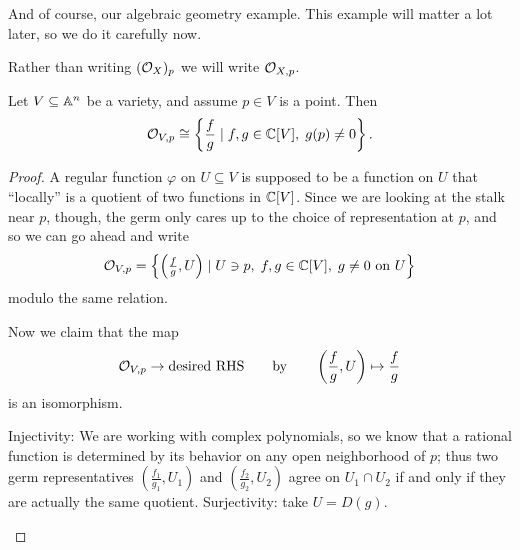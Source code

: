 And of course, our algebraic geometry example.
This example will matter a lot later,
so we do it carefully now.
\begin{abuse}
	Rather than writing $(\mathcal O_X)_p$ we will write $\mathcal O_{X,p}$.
\end{abuse}
\begin{theorem}
	[Stalks of $\OO_V$]
	\label{thm:stalks_affine_var}
	Let $V \subseteq \mathbb A^n$ be a variety,
	and assume $p \in V$ is a point.
	Then \[ \mathcal O_{V,p} \cong
		\left\{ \frac fg \mid f,g \in \mathbb C[V], \; g(p) \neq 0 \right\}. \]
\end{theorem}
\begin{proof}
	A regular function $\varphi$ on $U \subseteq V$
	is supposed to be a function on $U$ that ``locally'' is a quotient
	of two functions in $\mathbb C[V]$.
	Since we are looking at the stalk near $p$, though,
	the germ only cares up to the choice of representation at $p$,
	and so we can go ahead and write
	\[
		\mathcal O_{V,p} =
		\left\{ \left( \tfrac fg , U \right) \mid
			U \ni p, \; f,g \in \mathbb C[V], \;
			\text{$g \neq 0$ on $U$} \right\}
	\]
	modulo the same relation.

	Now we claim that the map
	\[ \mathcal O_{V,p} \to \text{desired RHS}
		\qquad\text{by}\qquad \left( \frac fg, U \right) \mapsto \frac fg \]
	is an isomorphism.
	\begin{itemize}
		\ii Injectivity: We are working with complex polynomials,
		so we know that a rational function is determined by its
		behavior on any open neighborhood of $p$;
		thus two germ representatives $(\frac{f_1}{g_1}, U_1)$
		and $(\frac{f_2}{g_2}, U_2)$ agree on $U_1 \cap U_2$
		if and only if they are actually the same quotient.
		\ii Surjectivity: take $U = D(g)$. \qedhere
	\end{itemize}
\end{proof}

